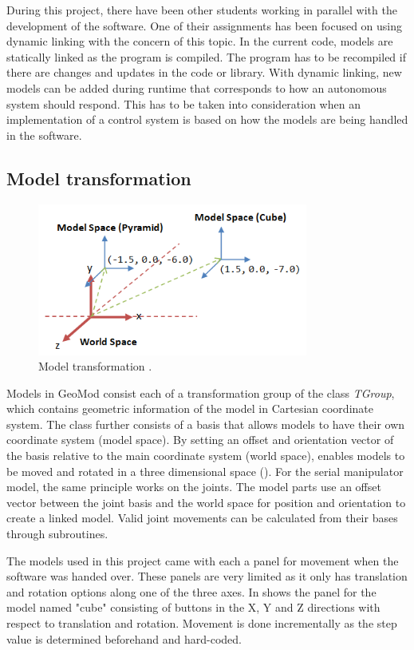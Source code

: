 During this project, there have been other students working in parallel with the development of the software. One of their assignments has been focused on using dynamic linking with the concern of this topic. In the current code, models are statically linked as the program is compiled. The program has to be recompiled if there are changes and updates in the code or library. With dynamic linking, new models can be added during runtime that corresponds to how an autonomous system should respond. This has to be taken into consideration when an implementation of a control system is based on how the models are being handled in the software.


\subsection{Model transformation}

\begin{figure}[ht]
    \centering
    \includegraphics[height=5cm]{images/ModelSpace.png}
    \caption[Model transformation \cite{modelspace}]{Model transformation \cite{modelspace}.}
    \label{fig:modelspace}
\end{figure}

Models in GeoMod consist each of a transformation group of the class \textit{TGroup}, which contains geometric information of the model in Cartesian coordinate system. The class further consists of a basis that allows models to have their own coordinate system (model space). By setting an offset and orientation vector of the basis relative to the main coordinate system (world space), enables models to be moved and rotated in a three dimensional space (). For the serial manipulator model, the same principle works on the joints. The model parts use an offset vector between the joint basis and the world space for position and orientation to create a linked model. Valid joint movements can be calculated from their bases through subroutines.

The models used in this project came with each a panel for movement when the software was handed over. These panels are very limited as it only has translation and rotation options along one of the three axes. In  shows the panel for the model named "cube" consisting of buttons in the X, Y and Z directions with respect to translation and rotation. Movement is done incrementally as the step value is determined beforehand and hard-coded. 

